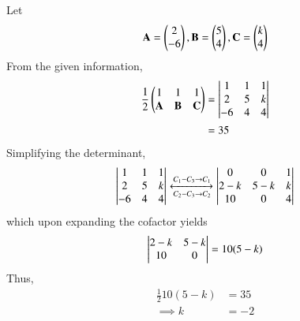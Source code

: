 Let
\begin{align}
   \mathbf{A} = \begin{pmatrix}2\\-6\end{pmatrix} , \mathbf{B} = \begin{pmatrix}5 \\ 4\end{pmatrix}, \mathbf{C} = \begin{pmatrix}k\\4\end{pmatrix} 
\end{align}
From the given information,
%
\begin{align}
   \frac{1}{2}\begin{pmatrix}1 & 1& 1 \\
   \mathbf{A}&\mathbf{B}&\mathbf{C}\end{pmatrix}
   &= \begin{vmatrix}
    1 & 1 & 1 \\ 
    2 & 5 & k \\ 
    -6 & 4 & 4\end{vmatrix} \\ &= 35
\end{align}
Simplifying the determinant, 
\begin{align}
   \begin{vmatrix}1 & 1 & 1  \\ 
 2 & 5 & k \\ 
-6 & 4 & 4\end{vmatrix}
\xleftrightarrow [C_2-C_3\rightarrow C_2]{C_1-C_3\rightarrow C_1}
 \begin{vmatrix}0 & 0 & 1  \\ 
 2-k & 5-k & k \\ 
10 & 0 & 4\end{vmatrix}
\end{align}
which upon expanding the cofactor yields
\begin{align}
     \begin{vmatrix}2-k & 5-k \\ 
10 & 0 \end{vmatrix} = 10(5-k)
\end{align}
Thus, 
\begin{align}
   \frac{1}{2}10(5-k) &= 35
\\
  \implies  k &= -2
\end{align}